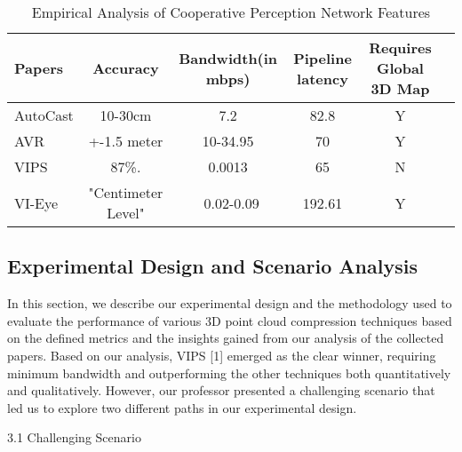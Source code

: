 \documentclass[conference]{IEEEtran}
\begin{document}



\begin{table*}[htbp]
    \centering
    \caption{Empirical Analysis of Cooperative Perception Network Features}
    \label{tab:empirical_analysis}
    \begin{tabular}{@{}lccccc@{}}
    \toprule
    Papers & Accuracy & Bandwidth(in mbps) & Pipeline latency & Requires Global 3D Map \\ \midrule
    AutoCast & 10-30cm & 7.2 & 82.8 & Y  \\
    AVR & +-1.5 meter & 10-34.95 & 70 & Y  \\
    VIPS  & 87\%. & 0.0013 & 65 & N  \\
    VI-Eye & "Centimeter Level" & ~0.02-0.09 & 192.61 & Y  \\
    \bottomrule
    \end{tabular}
    \end{table*}

\subsection{Experimental Design and Scenario Analysis}
In this section, we describe our experimental design and the methodology used to evaluate the performance of various 3D point cloud compression techniques based on the defined metrics and the insights gained from our analysis of the collected papers. Based on our analysis, VIPS [1] emerged as the clear winner, requiring minimum bandwidth and outperforming the other techniques both quantitatively and qualitatively. However, our professor presented a challenging scenario that led us to explore two different paths in our experimental design.

3.1 Challenging Scenario
\end{document}
